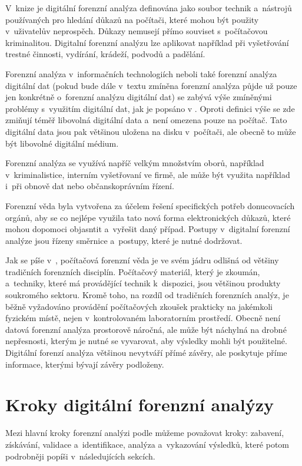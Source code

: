 \documentclass[thesis=B,czech]{FITthesis}[2012/06/26]
\begin{document}
V~knize \cite{RECHAndBook} je digitální forenzní analýza definována jako soubor technik a~nástrojů používaných pro hledání důkazů na počítači, které mohou být použity v~uživatelův neprospěch. Důkazy nemusejí přímo souviset s~počítačovou kriminalitou. Digitalní forenzní analýzu lze aplikovat například při vyšetřování trestné činnosti, vydírání, krádeží, podvodů a padělání.

Forenzní analýza v~informačních technologiích neboli také forenzní analýza digitální dat (pokud bude dále v~textu zmíněna forenzní analýza půjde už pouze jen konkrétně o~forenzní analýzu digitální dat) se zabývá výše zmíněnými problémy s~využitím digitální dat, jak je popsáno v \cite{for_root}. Oproti definici výše se zde zmiňují téměř libovolná digitální data a~není omezena pouze na počítač. Tato digitální data jsou pak většinou uložena na disku v~počítači, ale obecně to může být libovolné digitální médium.

Forenzní analýza se využívá napříč velkým množstvím oborů, například v~kriminalistice, interním vyšetřovaní ve firmě, ale může být využita například i~při obnově dat nebo občanskoprávním řízení.

Forenzní věda byla vytvořena za účelem řešení specifických potřeb donucovacích orgánů, aby se co nejlépe využila tato nová forma elektronických důkazů, které mohou dopomoci objasntit a~vyřešit daný případ. Postupy v~digitalní forenzní analýze jsou řízeny směrnice a~postupy, které je nutné dodržovat.

Jak se píše v~\cite{for_uvod}, počítačová forenzní věda je ve svém jádru odlišná od většiny tradičních forenzních disciplín. Počítačový materiál, který je zkoumán, a~techniky, které má provádějící technik k~dispozici, jsou většinou produkty soukromého sektoru. Kromě toho, na rozdíl od tradičních forenzních analýz, je běžně vyžadováno provádění počítačových zkoušek prakticky na jakémkoli fyzickém místě, nejen v~kontrolovaném laboratorním prostředí. Obecně není datová forenzní analýza prostorově náročná, ale může být náchylná na drobné nepřesnosti, kterým je nutné se vyvarovat, aby výsledky mohli být použitelné. Digitální forenzí analýza většinou nevytváří přímé závěry, ale poskytuje příme informace, kterými bývají závěry podloženy.


\section{Kroky digitální forenzní analýzy}
Mezi hlavní kroky forenzní analýzi podle \cite{carroll2008computer} můžeme považovat kroky: zabavení, získávání, validace a~identifikace, analýza a~vykazování výsledků, které potom podrobněji popíši v~následujících sekcích.
\end{document}
